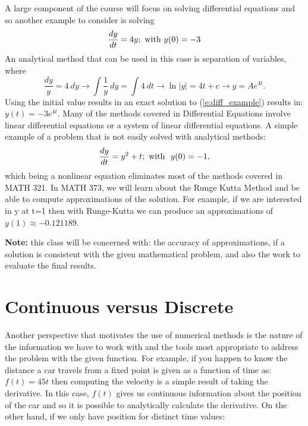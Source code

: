 \documentclass[twoside]{article}
\def\ds{\displaystyle}
\begin{document}
A large component of the course will focus on solving differential equations and so another example to consider is solving
\begin{equation}
\frac {dy}{dt} = 4y; \ {\rm with} \   y(0)=-3
\label{e:diff_example}
\end{equation}
An analytical method that can be used in this case is separation of variables, where
$$ \frac {dy}y = 4 \  dy  \rightarrow \int \frac 1y \ dy = \int 4 \  dt \rightarrow \ln \vert y \vert  = 4t+c \rightarrow y = Ae^{4t}.$$
Using the initial value results in an exact solution to (\ref{e:diff_example}) results in: $\ds y(t)=-3e^{4t}$. Many of the methods covered in Differential Equations involve linear differential equations or a system of linear differential equations. A simple example of a problem that is not easily solved with analytical methods:
\begin{equation}
\frac {dy}{dt} = y^2+t; \ {\rm with} \ \ y(0)=-1,
\label{e:diff_num_example}
\end{equation}
which being a nonlinear equation eliminates most of the methods covered in MATH 321. In MATH 373, we will learn about the Runge Kutta Method and be able to compute approximations of the solution. For example, if we are interested in y at t=1 then with Runge-Kutta we can produce an approximations of $y(1)\approx -0.121189$. 

{\bf Note:} {\color{teal} this class will be concerned with: the accuracy of approximations, if a solution is consistent with the given mathematical problem, and also the work to evaluate the final results. }

\section{Continuous versus Discrete}
Another perspective that motivates the use of numerical methods is the nature of the information we have to work with and the tools most appropriate to address the problem with the given function. For example, if you happen to know the distance a car travels from a fixed point is given as a function of time as: $\ds f(t)=45t$ then computing the velocity is a simple result of taking the derivative. In this case, $f(t)$ gives us continuous information about the position of the car and so it is possible to analytically calculate the derivative. On the other hand, if we only have position for distinct time values: \par
\end{document}
